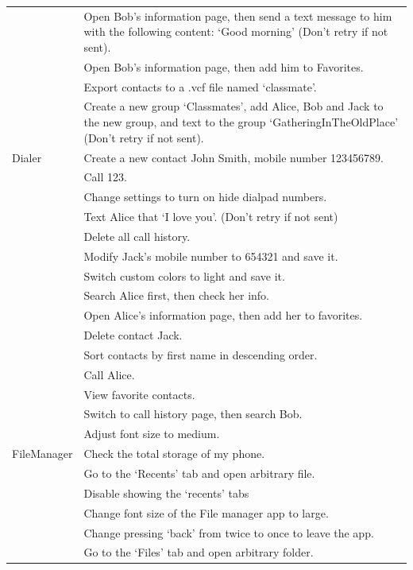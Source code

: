 \begin{longtable}{|p{1.8cm}|p{10.5cm}|}
         & Open Bob's information page, then send a text message to him with the following content: `Good morning' (Don't retry if not sent). \\
         & Open Bob's information page, then add him to Favorites. \\
         & Export contacts to a .vcf file named `classmate'. \\
         & Create a new group `Classmates', add Alice, Bob and Jack to the new group, and text to the group `GatheringInTheOldPlace' (Don't retry if not sent). \\
\hline
Dialer & Create a new contact John Smith, mobile number 123456789. \\
       & Call 123. \\
       & Change settings to turn on hide dialpad numbers. \\
       & Text Alice that `I love you'. (Don't retry if not sent) \\
       & Delete all call history. \\
       & Modify Jack's mobile number to 654321 and save it. \\
       & Switch custom colors to light and save it. \\
       & Search Alice first, then check her info. \\
       & Open Alice's information page, then add her to favorites. \\
       & Delete contact Jack. \\
       & Sort contacts by first name in descending order. \\
       & Call Alice. \\
       & View favorite contacts. \\
       & Switch to call history page, then search Bob. \\
       & Adjust font size to medium. \\
\hline
FileManager & Check the total storage of my phone. \\
            & Go to the `Recents' tab and open arbitrary file. \\
            & Disable showing the `recents' tabs \\
            & Change font size of the File manager app to large. \\
            & Change pressing `back' from twice to once to leave the app. \\
            & Go to the `Files' tab and open arbitrary folder. \\

\end{longtable}
